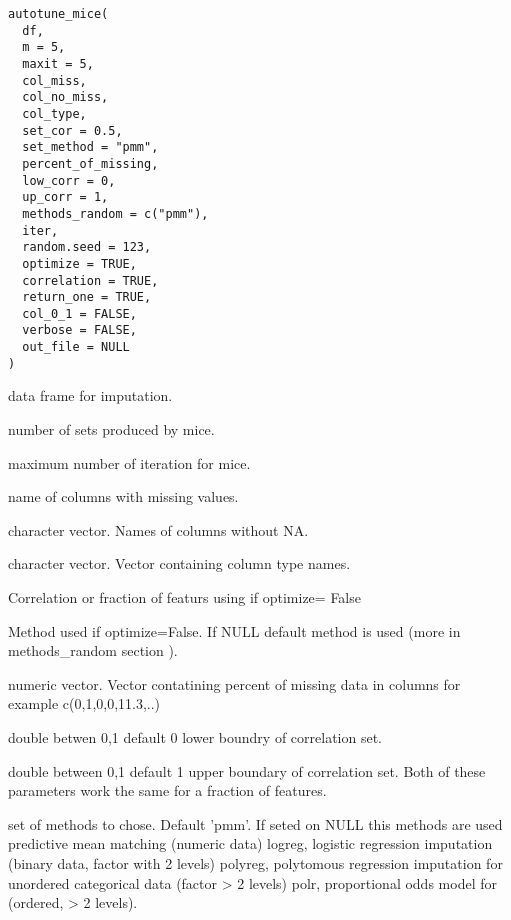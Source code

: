 \documentclass[letterpaper]{book}
\begin{document}
%
\begin{Usage}
\begin{verbatim}
autotune_mice(
  df,
  m = 5,
  maxit = 5,
  col_miss,
  col_no_miss,
  col_type,
  set_cor = 0.5,
  set_method = "pmm",
  percent_of_missing,
  low_corr = 0,
  up_corr = 1,
  methods_random = c("pmm"),
  iter,
  random.seed = 123,
  optimize = TRUE,
  correlation = TRUE,
  return_one = TRUE,
  col_0_1 = FALSE,
  verbose = FALSE,
  out_file = NULL
)
\end{verbatim}
\end{Usage}
%
\begin{Arguments}
\begin{ldescription}
\item[\code{df}] data frame for imputation.

\item[\code{m}] number of sets produced by mice.

\item[\code{maxit}] maximum number of iteration for mice.

\item[\code{col\_miss}] name of columns with missing values.

\item[\code{col\_no\_miss}] character vector. Names of columns without NA.

\item[\code{col\_type}] character vector. Vector containing column type names.

\item[\code{set\_cor}] Correlation or fraction of featurs using if optimize= False

\item[\code{set\_method}] Method used if optimize=False. If NULL default method is used (more in methods\_random section ).

\item[\code{percent\_of\_missing}] numeric vector. Vector contatining percent of missing data in columns for example  c(0,1,0,0,11.3,..)

\item[\code{low\_corr}] double betwen 0,1 default 0 lower boundry of correlation set.

\item[\code{up\_corr}] double between 0,1 default 1 upper boundary of correlation set. Both of these parameters work the same for a fraction of features.

\item[\code{methods\_random}] set of methods to chose. Default 'pmm'. If seted on NULL this methods are used predictive mean matching (numeric data) logreg, logistic regression imputation (binary data, factor with 2 levels) polyreg, polytomous regression imputation for unordered categorical data (factor > 2 levels) polr, proportional odds model for (ordered, > 2 levels).


\end{ldescription}
\end{Arguments}
\end{document}
